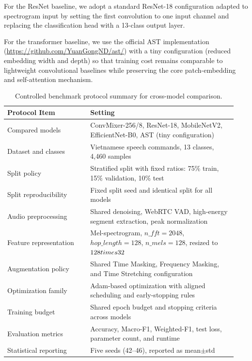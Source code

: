 For the ResNet baseline, we adopt a standard ResNet-18 configuration adapted to spectrogram input by setting the first convolution to one input channel and replacing the classification head with a 13-class output layer.

For the transformer baseline, we use the official AST implementation (\url{https://github.com/YuanGongND/ast/}) with a tiny configuration (reduced embedding width and depth) \cite{Gong2021AST} so that training cost remains comparable to lightweight convolutional baselines while preserving the core patch-embedding and self-attention mechanism.

\begin{table}[htbp]
\centering
\small
\caption{\label{tab:benchmark_protocol_summary}Controlled benchmark protocol summary for cross-model comparison.}
\begin{tabular}{p{0.34\linewidth}p{0.60\linewidth}}
\hline
\textbf{Protocol Item} & \textbf{Setting} \\
\hline
Compared models & ConvMixer-256/8, ResNet-18, MobileNetV2, EfficientNet-B0, AST (tiny configuration) \\
Dataset and classes & Vietnamese speech commands, 13 classes, 4{,}460 samples \\
Split policy & Stratified split with fixed ratios: 75\% train, 15\% validation, 10\% test \\
Split reproducibility & Fixed split seed and identical split for all models \\
Audio preprocessing & Shared denoising, WebRTC VAD, high-energy segment extraction, peak normalization \\
Feature representation & Mel-spectrogram, $n\_fft=2048$, $hop\_length=128$, $n\_{mels}=128$, resized to $128\\times32$ \\
Augmentation policy & Shared Time Masking, Frequency Masking, and Time Stretching configuration \\
Optimization family & Adam-based optimization with aligned scheduling and early-stopping rules \\
Training budget & Shared epoch budget and stopping criteria across models \\
Evaluation metrics & Accuracy, Macro-F1, Weighted-F1, test loss, parameter count, and runtime \\
Statistical reporting & Five seeds (42--46), reported as mean$\pm$std \\
\hline
\end{tabular}
\normalsize
\end{table}

